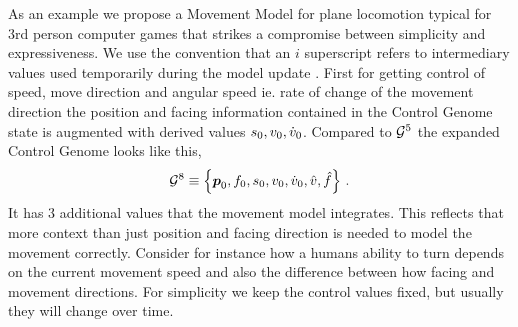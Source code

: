 As an example we propose a Movement Model for plane locomotion typical for 3rd person computer games   that strikes a compromise between simplicity and expressiveness. We use the convention that an $i$ superscript refers to intermediary values used temporarily during the model update . 
%
First for getting control of speed, move direction and angular speed ie. rate of change of the movement direction the position and facing information contained in the Control Genome state is augmented with derived values $s_0, v_0, {\dot{v}}_0$. 
%
Compared to $\mathcal{G}^{5}$ the expanded Control Genome looks like this,
\begin{subequations}
\begin{align}
    \mathcal{G}^{8} \equiv \left\{ \boldsymbol{p }_0,f_0,s_0,v_0,{\dot{v}}_0,\hat{v},\hat{f} \right\}\,.
\end{align}
\end{subequations}
It has 3 additional values that the movement model integrates. This reflects that more context than just position and facing direction is needed to model the movement correctly. Consider for instance how a humans ability to turn depends on the current movement speed and also the difference between how facing and movement directions. For simplicity we keep the control values fixed, but usually they will change over time.

